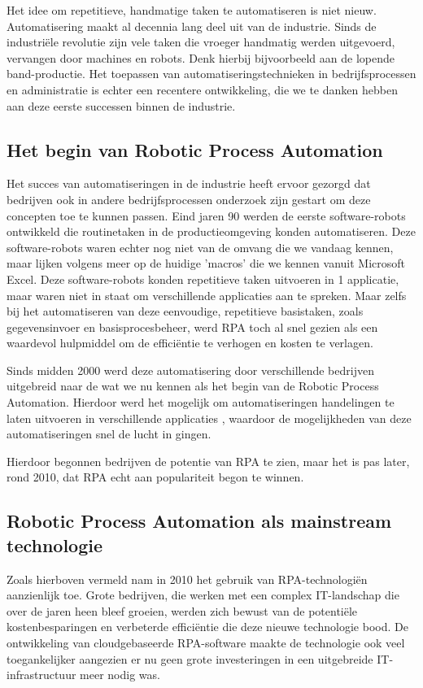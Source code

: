 Het idee om repetitieve, handmatige taken te automatiseren is niet nieuw.
Automatisering maakt al decennia lang deel uit van de industrie. Sinds de industriële revolutie zijn vele taken die vroeger handmatig werden uitgevoerd, vervangen door machines en robots. Denk hierbij bijvoorbeeld aan de lopende band-productie. Het toepassen van automatiseringstechnieken in bedrijfsprocessen en administratie is echter een recentere ontwikkeling, die we te danken hebben aan deze eerste successen binnen de industrie.

\subsection{Het begin van Robotic Process Automation}

Het succes van automatiseringen in de industrie heeft ervoor gezorgd dat bedrijven ook in andere bedrijfsprocessen onderzoek zijn gestart om deze concepten toe te kunnen passen. Eind jaren 90 werden de eerste software-robots ontwikkeld die routinetaken in de productieomgeving konden automatiseren. Deze software-robots waren echter nog niet van de omvang die we vandaag kennen, maar lijken volgens \textcite{ZalewskaTurzynska2022} meer op de huidige 'macros' die we kennen vanuit Microsoft Excel. 
Deze software-robots konden repetitieve taken uitvoeren in 1 applicatie, maar waren niet in staat om verschillende applicaties aan te spreken. Maar zelfs bij het automatiseren van deze eenvoudige, repetitieve basistaken, zoals gegevensinvoer en basisprocesbeheer, werd RPA toch al snel gezien als een waardevol hulpmiddel om de efficiëntie te verhogen en kosten te verlagen.

Sinds midden 2000 werd deze automatisering door verschillende bedrijven uitgebreid naar de wat we nu kennen als het begin van de Robotic Process Automation. Hierdoor werd het mogelijk om automatiseringen handelingen te laten uitvoeren in verschillende applicaties \autocite{Fluss2020}, waardoor de mogelijkheden van deze automatiseringen snel de lucht in gingen.

Hierdoor begonnen bedrijven de potentie van RPA te zien, maar het is pas later, rond 2010, dat RPA echt aan populariteit begon te winnen.

\subsection{Robotic Process Automation als mainstream technologie}

Zoals hierboven vermeld nam in 2010 het gebruik van RPA-technologiën aanzienlijk toe. Grote bedrijven, die werken met een complex IT-landschap die over de jaren heen bleef groeien, werden zich bewust van de potentiële kostenbesparingen en verbeterde efficiëntie die deze nieuwe technologie bood. De ontwikkeling van cloudgebaseerde RPA-software maakte de technologie ook veel toegankelijker aangezien er nu geen grote investeringen in een uitgebreide IT-infrastructuur meer nodig was.

